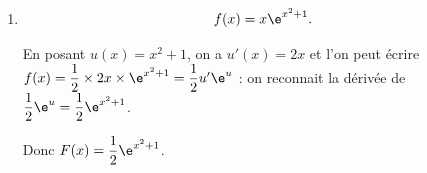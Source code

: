 \begin{enumerate}[resume]
$\bullet~~$Au voisinage de plus l'infini : on sait que $\displaystyle\lim_{x \to + \infty} g(x) = + \infty$, donc pas d'asymptote.

\item %

\[f(x) = x\e^{x^2+1}.\]


En posant $u(x) = x^2 + 1$, on a $u'(x) = 2x$ et l'on peut écrire $f(x) = \dfrac12 \times 2x \times \e^{x^2+1} = \dfrac12 u'\e^u$ : on reconnait la dérivée de $\dfrac12\e^u = \dfrac12\e^{x^2 + 1}$.

Donc $F(x) = \dfrac12\e^{x^2+1}$.
\end{enumerate}
